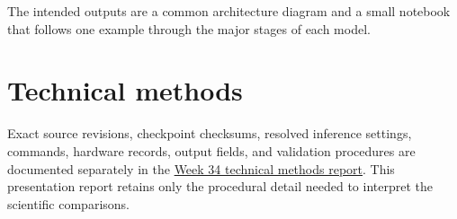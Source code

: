 \documentclass[11pt]{article}
\begin{document}
The intended outputs are a common architecture diagram and a small notebook
that follows one example through the major stages of each model.

\section*{Technical methods}

Exact source revisions, checkpoint checksums, resolved inference settings,
commands, hardware records, output fields, and validation procedures are
documented separately in the
\href{https://github.com/Yusheng-cai/BindingAffinityPredictor/blob/main/weeks/2026-W34/technical-report/report.pdf}{Week 34 technical methods report}.
This presentation report retains only the procedural detail needed to
interpret the scientific comparisons.



\end{document}
